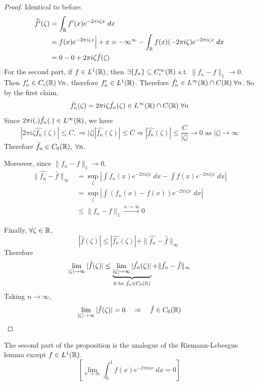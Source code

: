 \begin{proof}
    Identical to before. 
    \begin{align*}
        \widehat{f'}(\zeta) &= \int_{\mathbb{R}} f'(x) e^{-2 \pi i \zeta x} \; dx \\
        &= f(x) e^{-2 \pi i \zeta x} \Big|+{x = -\infty}^\infty - \int_{\mathbb{R}} f(x) (-2 \pi i \zeta) e^{-2 \pi i \zeta x} \; dx \\
        &= 0 - 0 + 2 \pi i \zeta \hat{f}(\zeta)
    \end{align*}
    For the second part, if $f \in L^1(\mathbb{R})$, then $\exists \{f_n\} \subseteq C_c^\infty(\mathbb{R})$ s.t. $\| f_n - f \|_1 \to 0$.
    Then $f_n' \in C_c(\mathbb{R}) \; \forall n$, therefore $f_n' \in L^1(\mathbb{R})$. Therefore $\hat{f_n'} \in L^\infty(\mathbb{R}) \cap C(\mathbb{R}) \; \forall n$.
    So by the first claim,
    \[
        \hat{f_n'}(\zeta) = 2 \pi i \zeta \hat{f_n}(\zeta) \in L^\infty(\mathbb{R}) \cap C(\mathbb{R}) \; \forall n
    \]    
    Since $2 \pi i (.) \hat{f_n}(.) \in L^\infty(\mathbb{R})$, we have
    \[
        |2 \pi i \zeta \hat{f_n}(\zeta)| \leq C, \Rightarrow |\zeta| |\hat{f_n}(\zeta)| \leq C \Rightarrow |\hat{f_n}(\zeta)| \leq \frac{C}{|\zeta|} \to 0 \text{ as } |\zeta| \to \infty
    \]  
    Therefore $\hat{f_n} \in C_0(\mathbb{R}), \; \forall n$.
    
    Moreover, since $\| f_n - f \|_1 \to 0 $, 
    \begin{align*}
        \| \hat{f_n} - \hat{f} \|_\infty &= \sup_{\zeta} \left| \int f_n(x) e^{-2 \pi i \zeta x} \; dx - \int f(x) e^{-2 \pi i \zeta x} \; dx \right| \\
        &= \sup_{\zeta} \left| \int (f_n(x) - f(x)) e^{-2 \pi i \zeta x} \; dx \right| \\
        &\leq \| f_n - f \|_1 \xrightarrow{n \to \infty} 0    
    \end{align*} 

    Finally, $\forall \zeta \in \mathbb{R}$,
    \[
        |\hat{f}(\zeta)| \leq |\hat{f_n}(\zeta)| + \| \hat{f_n} - \hat{f} \|_\infty 
    \]  
    Therefore
    \[
        \lim_{|\zeta| \to \infty} |\hat{f}(\zeta)| \leq \underbrace{\lim_{|\zeta| \to \infty} |\hat{f_n}(\zeta)|}_{0 \text{ bc } \hat{f_n} \in C_0(\mathbb{R})} + \| \hat{f_n} - \hat{f} \|_\infty 
    \] 
    Taking $n \to \infty$,
    \[
        \lim_{|\zeta| \to \infty} |\hat{f}(\zeta)| = 0 \quad \Rightarrow \quad \hat{f} \in C_0(\mathbb{R}) \qedhere
    \]  
\end{proof}

\begin{rem}
    The second part of the proposition is the analogue of the Riemann-Lebesgue lemma except $f \in L^1(\mathbb{R})$.
    \[
        \left[\lim_{n \to \infty} \int_0^1 f(x) e^{-2 \pi i n x} \; dx = 0 \right]
    \]      
\end{rem}

